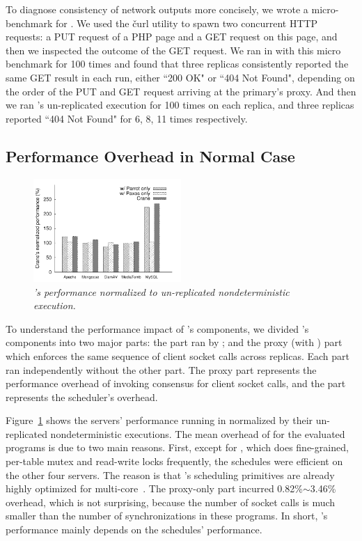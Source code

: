 To diagnose consistency of network outputs more concisely, we wrote a 
micro-benchmark for \apache. We used the \v{curl} utility to spawn two 
concurrent HTTP requests: a PUT request of a PHP page and a GET request on 
this page, and then we inspected the outcome of the GET request. We ran \apache 
in \xxx with this micro benchmark for 100 times and found that three replicas 
consistently reported the same GET result in each run, either ``200 OK" or 
``404 Not Found", depending on the order of the PUT and GET request arriving at 
the primary's proxy. And then we ran \apache's un-replicated 
execution for 100 times on each replica, and three replicas reported ``404 Not 
Found" for 6, 8, 11 times respectively.

\subsection{Performance Overhead in Normal Case} \label{sec:overhead}

\begin{figure}[t]
\centering
\includegraphics[width=0.5\textwidth]{figures/normalize-perf}
\vspace{-.10in}
\caption{\small {\em \xxx's performance normalized to un-replicated 
nondeterministic execution.}}
\label{fig:normalize-perf}
\end{figure}


To understand the performance impact of \xxx's components, we divided \xxx's 
components into two major parts: the \dmt part ran by \parrot; and the proxy 
(with \paxos) part which enforces the same sequence of client socket 
calls across replicas. Each part ran independently without the other 
part. The proxy part represents the performance overhead of invoking \paxos 
consensus for client socket calls, and the \dmt part represents the \parrot 
\dmt scheduler's overhead.

Figure~\ref{fig:normalize-perf} shows the servers' performance running in 
\xxx normalized by their un-replicated nondeterministic executions. The mean 
overhead of \xxx for the \nprog evaluated programs is \overhead 
due to two main reasons. First, except for \mysql, which does fine-grained, 
per-table mutex and read-write locks frequently, the \dmt schedules were 
efficient on the other four servers. The reason is that \parrot's scheduling 
primitives are already highly optimized for multi-core~\cite{parrot:sosp13}. 
The proxy-only part incurred 0.82\%$\sim$3.46\% overhead, which is not 
surprising, because the number of socket calls is much smaller than 
the number of \pthread synchronizations in these programs. In short, \xxx's 
performance mainly depends on the \dmt schedules' performance.

